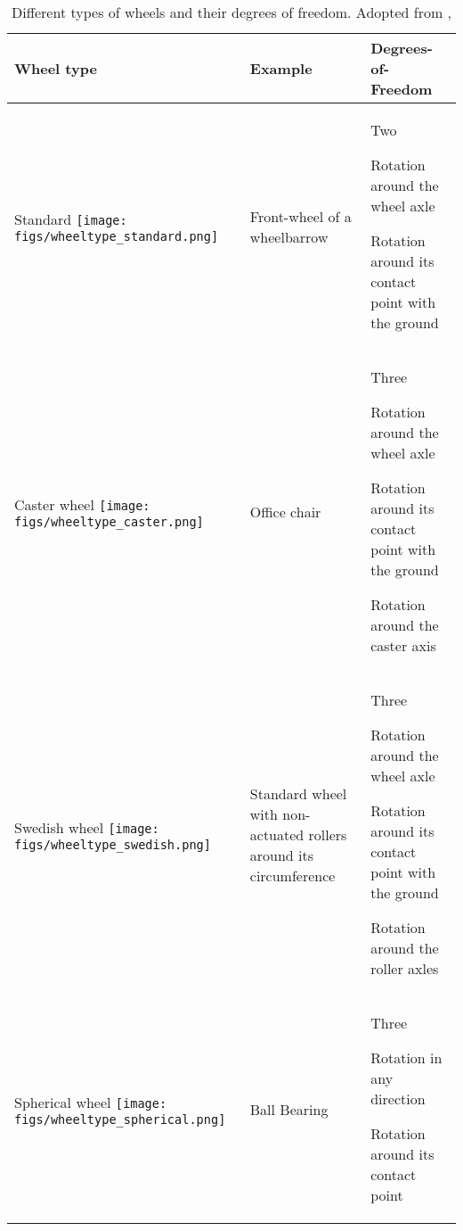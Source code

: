 \begin{table}
\begin{tabular}{p{2.8cm}p{3cm}p{4cm}}
\hline
Wheel type & Example & Degrees-of-Freedom\\
\hline
Standard \texttt{[image: figs/wheeltype\_standard.png]} &	Front-wheel of a wheelbarrow	& Two
\begin{compactitem}
\item Rotation around the wheel axle
\item Rotation around its contact point with the ground
\end{compactitem}\\
\hline
Caster wheel	\texttt{[image: figs/wheeltype\_caster.png]}& Office chair & Three
\begin{compactitem}
\item Rotation around the wheel axle
\item Rotation around its contact point with the ground
\item Rotation around the caster axis
\end{compactitem}\\
\hline
Swedish wheel \texttt{[image: figs/wheeltype\_swedish.png]}& Standard wheel with non-actuated rollers around its circumference& Three
\begin{compactitem}
\item Rotation around the wheel axle
\item Rotation around its contact point with the ground
\item Rotation around the roller axles
\end{compactitem}\\
\hline
Spherical wheel \texttt{[image: figs/wheeltype\_spherical.png]}& Ball Bearing & Three
\begin{compactitem}
\item Rotation in any direction
\item Rotation around its contact point
\end{compactitem}\\
\hline
\end{tabular}
\caption{Different types of wheels and their degrees of freedom. Adopted from \protect{},\label{tab:wheels}}
\end{table}

